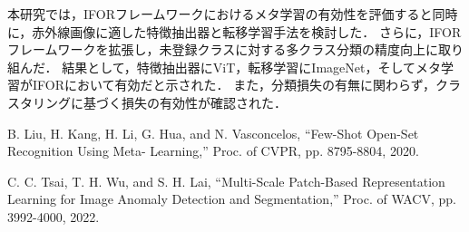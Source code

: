 \documentclass[uplatex,dvipdfmx,10pt,twocolumn]{jsarticle}
\begin{document}
本研究では，IFORフレームワークにおけるメタ学習の有効性を評価すると同時に，赤外線画像に適した特徴抽出器と転移学習手法を検討した．
さらに，IFOR フレームワークを拡張し，未登録クラスに対する多クラス分類の精度向上に取り組んだ．
結果として，特徴抽出器にViT，転移学習にImageNet，そしてメタ学習がIFORにおいて有効だと示された．
また，分類損失の有無に関わらず，クラスタリングに基づく損失の有効性が確認された．

\begin{thebibliography}{9}
B. Liu, H. Kang, H. Li, G. Hua, and N. Vasconcelos, 
``Few-Shot Open-Set Recognition Using Meta- Learning,'' 
Proc. of CVPR, pp. 8795-8804, 2020.

C. C. Tsai, T. H. Wu, and S. H. Lai, 
``Multi-Scale Patch-Based Representation Learning for Image Anomaly Detection and Segmentation,'' 
Proc. of WACV, pp. 3992-4000, 2022.
\end{thebibliography}
\end{document}
